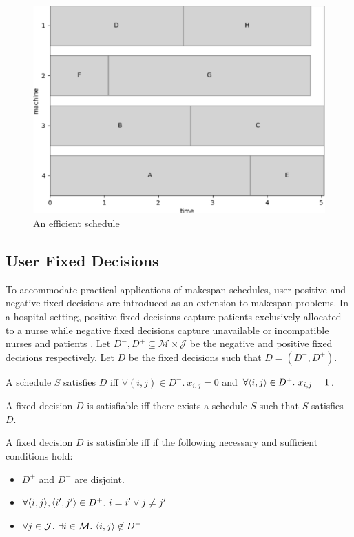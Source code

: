 \begin{figure}[H]
	\begin{center}
		\includegraphics[width=.8\linewidth]{figures/makespan_efficient.pdf}	
	\end{center}
	\caption{An efficient schedule}
\end{figure}

\subsection{User Fixed Decisions}
\label{fixeddecisions}

To accommodate practical applications of makespan schedules, user positive and negative fixed decisions are introduced as an extension to makespan problems. In a hospital setting, positive fixed decisions capture patients exclusively allocated to a nurse while negative fixed decisions capture unavailable or incompatible nurses and patients \cite{aes}. Let $D^-,D^+\subseteq\mathcal{M}\times\mathcal{J}$ be the negative and positive fixed decisions respectively. Let $D$ be the fixed decisions such that $D=(D^-,D^+)$.

\begin{definition}
	A schedule $S$ satisfies $D$ iff $\forall(i,j)\in D^-.\ x_{i,j}=0$ and $\forall \pair{i}{j}\in D^+.\ x_{i,j}=1$.
\end{definition}

\begin{definition}
	A fixed decision $D$ is satisfiable iff there exists a schedule $S$ such that $S$ satisfies $D$. 
\end{definition}

A fixed decision $D$ is satisfiable iff if the following necessary and sufficient conditions hold:
\begin{itemize}
	\item$D^+$ and $D^-$ are disjoint.
	\item$\forall\langle{i},{j}\rangle,\langle{i'},{j'}\rangle\in D^+.\ i=i'\lor j\neq j'$
	\item$\forall j\in\mathcal{J}.\ \exists i\in\mathcal{M}.\ \langle{i},{j}\rangle\not\in D^-$
\end{itemize}

